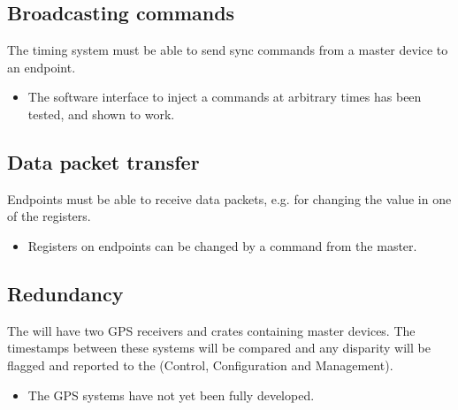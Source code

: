 \documentclass{dune}
\begin{document}
\subsection{Broadcasting commands}
The timing system must be able to send sync commands from a master device to an endpoint.
\begin{itemize}
  \item The software interface to inject a commands at arbitrary times has been tested, and shown to work.
\end{itemize}

\subsection{Data packet transfer}
Endpoints must be able to receive data packets, e.g. for changing the value in one of the registers.
\begin{itemize}
  \item Registers on endpoints can be changed by a command from the master.
\end{itemize}

\subsection{Redundancy}
The  will have two GPS receivers and crates containing master devices.
The timestamps between these systems will be compared and any disparity will be flagged and reported to the  (Control, Configuration and Management).
\begin{itemize}
  \item The GPS systems have not yet been fully developed.
\end{itemize}

\printglossary
\printbibliography
\end{document}

